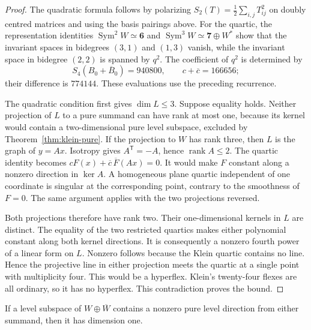 \begin{proof}
The quadratic formula follows by polarizing
$S_2(T)=\frac12\sum_{i,j}T_{ij}^2$ on doubly centred matrices and using the basis pairings above. For the quartic, the representation identities
$\operatorname{Sym}^2W\simeq\mathbf6$ and
$\operatorname{Sym}^3W\simeq\mathbf7\oplus W^*$
\cite[p.~55]{Elkies1999}
show that the invariant spaces in bidegrees $(3,1)$ and $(1,3)$ vanish, while the invariant space in bidegree $(2,2)$ is spanned by $q^2$. The coefficient of $q^2$ is determined by
\[
 S_4(B_0+\overline B_0)=940800,
 \qquad c+\overline c=166656;
\]
their difference is $774144$. These evaluations use the preceding recurrence.

The quadratic condition first gives $\dim L\leq3$. Suppose equality holds.
Neither projection of $L$ to a pure summand can have rank at most one, because its kernel would contain a two-dimensional pure level subspace, excluded by Theorem~\ref{thm:klein-pure}.
If the projection to $W$ has rank three, then $L$ is the graph of $y=Ax$.
Isotropy gives $A^{\mathsf T}=-A$, hence $\operatorname{rank}A\leq2$.
The quartic identity becomes $cF(x)+\overline c\,\overline F(Ax)=0$.
It would make $F$ constant along a nonzero direction in $\ker A$.
A homogeneous plane quartic independent of one coordinate is singular at the corresponding point, contrary to the smoothness of $F=0$.
The same argument applies with the two projections reversed.

Both projections therefore have rank two. Their one-dimensional kernels in $L$ are distinct. The equality of the two restricted quartics makes either polynomial constant along both kernel directions. It is consequently a nonzero fourth power of a linear form on $L$. Nonzero follows because the Klein quartic contains no line. Hence the projective line in either projection meets the quartic at a single point with multiplicity four. This would be a hyperflex. Klein's twenty-four flexes are all ordinary, so it has no hyperflex. This contradiction proves the bound.
\end{proof}

\begin{proposition}\label{prop:klein-noextension}
If a level subspace of $W\oplus\overline W$ contains a nonzero pure level direction from either summand, then it has dimension one.
\end{proposition}

